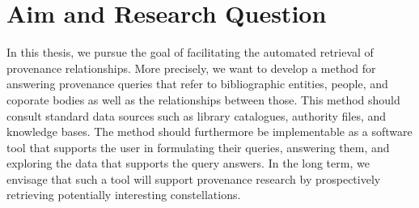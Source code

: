 
\section{Aim and Research Question}
\label{sec:research_questions}

In this thesis, we pursue the goal of facilitating
the automated retrieval of provenance relationships.
More precisely,
we want to develop a method for answering provenance queries that refer to bibliographic entities, people, and coporate bodies
as well as the relationships between those. This method should consult standard data sources such as 
library catalogues, authority files, and knowledge bases. The method should furthermore be implementable as a software tool
that supports the user in formulating their queries, answering them, and exploring the data that supports the query answers.
In the long term, we envisage that such a tool will support provenance research
by prospectively retrieving potentially interesting constellations.

